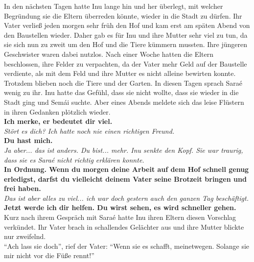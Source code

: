 \documentclass[a4paper,12pt]{book}
\begin{document}
In den nächsten Tagen hatte Inu lange hin und her überlegt, mit welcher Begründung sie die Eltern 
überreden könnte, wieder in die Stadt zu dürfen. Ihr Vater verließ jeden morgen sehr früh den Hof 
und kam erst am späten Abend von den Baustellen wieder. Daher gab es für Inu und ihre Mutter sehr 
viel zu tun, da sie sich nun zu zweit um den Hof und die Tiere kümmern mussten. Ihre jüngeren 
Geschwister waren dabei nutzlos. Nach einer Woche hatten die Eltern beschlossen, ihre Felder zu 
verpachten, da der Vater mehr Geld auf der Baustelle verdiente, als mit dem Feld und ihre Mutter es 
nicht alleine bewirten konnte. Trotzdem blieben noch die Tiere und der Garten. In diesen Tagen 
sprach Saraé wenig zu ihr. Inu hatte das Gefühl, dass sie nicht wollte, dass sie wieder in die 
Stadt ging und Semái suchte. Aber eines Abends meldete sich das leise Flüstern in ihren Gedanken 
plötzlich wieder.\\
\textbf{Ich merke, er bedeutet dir viel.}\\
\textit{Stört es dich? Ich hatte noch nie einen richtigen Freund.}\\
\textbf{Du hast mich.}\\
\textit{Ja aber... das ist anders. Du bist... mehr. Inu senkte den Kopf. Sie war traurig, dass sie 
es Saraé nicht richtig erklären konnte.}\\
\textbf{In Ordnung. Wenn du morgen deine Arbeit auf dem Hof schnell genug erledigst, darfst du 
vielleicht deinem Vater seine Brotzeit bringen und frei haben.}\\
\textit{Das ist aber alles zu viel... ich war doch gestern auch den ganzen Tag beschäftigt.}\\
\textbf{Jetzt werde ich dir helfen. Du wirst sehen, es wird schneller gehen.}\\
Kurz nach ihrem Gespräch mit Saraé hatte Inu ihren Eltern diesen Vorschlag verkündet. Ihr Vater 
brach in schallendes Gelächter aus und ihre Mutter blickte nur zweifelnd. \\
``Ach lass sie doch'', rief der Vater: ``Wenn sie es schafft, meinetwegen. Solange sie mir nicht 
vor die Füße rennt!''\\
\end{document}
